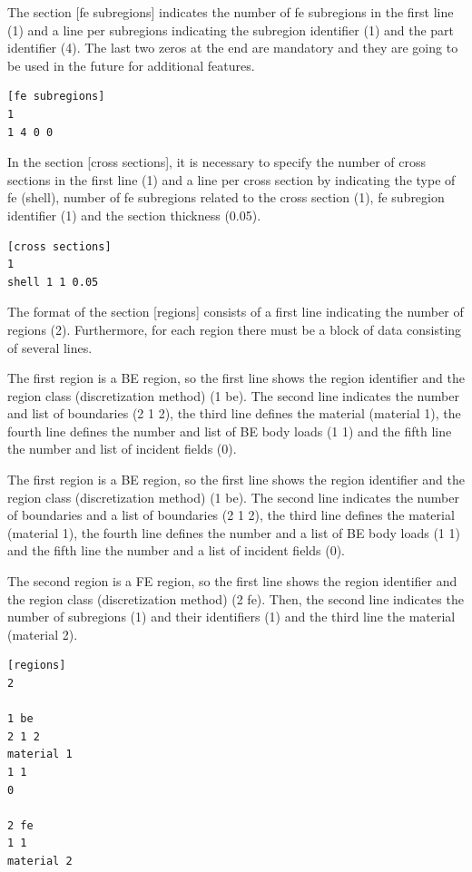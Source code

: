 \documentclass[a4]{article}
\begin{document}
The section [fe subregions] indicates the number of fe subregions in the first line (1) and a line per subregions indicating the subregion identifier (1) and the part identifier (4). The last two zeros at the end are mandatory and they are going to be used in the future for additional features.

\begin{Verbatim}
[fe subregions]
1
1 4 0 0
\end{Verbatim}

In the section [cross sections], it is necessary to specify the number of cross sections in the first line (1) and a line per cross section by indicating the type of fe (shell), number of fe subregions related to the cross section (1), fe subregion identifier (1) and the section thickness (0.05).

\begin{Verbatim}
[cross sections]
1
shell 1 1 0.05
\end{Verbatim}

The format of the section [regions] consists of a first line indicating the number of regions (2). Furthermore, for each region there must be a block of data consisting of several lines. 

The first region is a BE region, so the first line shows the region identifier and the region class (discretization method) (1 be). The second line indicates the number and list of boundaries (2 1 2), the third line defines the material (material 1), the fourth line defines the number and list of BE body loads (1 1) and the fifth line the number and list of incident fields (0).

The first region is a BE region, so the first line shows the region identifier and the region class (discretization method) (1 be). The second line indicates the number of boundaries and a list of boundaries (2 1 2), the third line defines the material (material 1), the fourth line defines the number and a list of BE body loads (1 1) and the fifth line the number and a list of incident fields (0).

The second region is a FE region, so the first line shows the region identifier and the region class (discretization method) (2 fe). Then, the second line indicates the number of subregions (1) and their identifiers (1) and the third line the material (material 2). 

\begin{Verbatim}	
[regions]
2

1 be
2 1 2
material 1 
1 1
0

2 fe
1 1
material 2 
\end{Verbatim}
\end{document}
